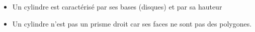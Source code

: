    
\begin{itemize}
\item Un cylindre est caractérisé par ses bases (disques) et par sa hauteur
\item Un cylindre n'est pas un prisme droit car ses faces ne sont pas des polygones.
\end{itemize}